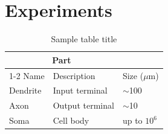 \section{Experiments}
\label{sec: experiment}
\lipsum[9]
\lipsum[10]

\begin{table}
  \caption{Sample table title}
  \label{sample-table}
  \centering
  \begin{tabular}{@{}lll@{}}
    \toprule
    \multicolumn{2}{c}{Part}                   \\
    \cmidrule(r){1-2}
    Name     & Description     & Size ($\mu$m) \\
    \midrule
    Dendrite & Input terminal  & $\sim$100     \\
    Axon     & Output terminal & $\sim$10      \\
    Soma     & Cell body       & up to $10^6$  \\
    \bottomrule
  \end{tabular}
\end{table}
